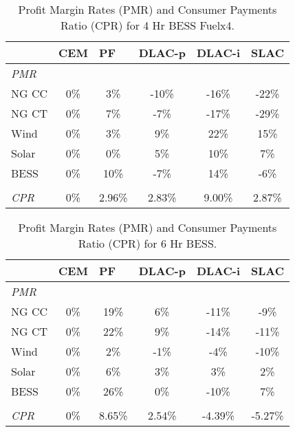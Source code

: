 \documentclass{article}
\begin{document}
\begin{table}[ht]
\centering
\begin{tabular}{lccccc}
\toprule
& \multicolumn{1}{l}{\textbf{CEM}} 
& \multicolumn{1}{l}{\textbf{PF}} 
& \multicolumn{1}{l}{\textbf{DLAC-p}} 
& \multicolumn{1}{l}{\textbf{DLAC-i}} 
& \multicolumn{1}{l}{\textbf{SLAC}} 
 \\ \hline
\midrule
\textit{PMR} & & & & \\
\quad NG CC & 0\% & 3\% & -10\% & -16\% & -22\% \\
\quad NG CT & 0\% & 7\% & -7\% & -17\% & -29\% \\
\quad Wind & 0\% & 3\% & 9\% & 22\% & 15\% \\
\quad Solar & 0\% & 0\% & 5\% & 10\% & 7\% \\
\quad BESS & 0\% & 10\% & -7\% & 14\% & -6\% \\
& & & & \\
\textit{CPR} & 0\% & 2.96\% & 2.83\% & 9.00\% & 2.87\% \\
\bottomrule
\end{tabular}
\caption{Profit Margin Rates (PMR) and Consumer Payments Ratio (CPR) for 4 Hr BESS Fuelx4.}
\label{table:4_Hr_BESS_Fuelx4_pmr}
\end{table}

\begin{table}[ht]
\centering
\begin{tabular}{lccccc}
\toprule
& \multicolumn{1}{l}{\textbf{CEM}} 
& \multicolumn{1}{l}{\textbf{PF}} 
& \multicolumn{1}{l}{\textbf{DLAC-p}} 
& \multicolumn{1}{l}{\textbf{DLAC-i}} 
& \multicolumn{1}{l}{\textbf{SLAC}} 
 \\ \hline
\midrule
\textit{PMR} & & & & \\
\quad NG CC & 0\% & 19\% & 6\% & -11\% & -9\% \\
\quad NG CT & 0\% & 22\% & 9\% & -14\% & -11\% \\
\quad Wind & 0\% & 2\% & -1\% & -4\% & -10\% \\
\quad Solar & 0\% & 6\% & 3\% & 3\% & 2\% \\
\quad BESS & 0\% & 26\% & 0\% & -10\% & 7\% \\
& & & & \\
\textit{CPR} & 0\% & 8.65\% & 2.54\% & -4.39\% & -5.27\% \\
\bottomrule
\end{tabular}
\caption{Profit Margin Rates (PMR) and Consumer Payments Ratio (CPR) for 6 Hr BESS.}
\label{table:6_Hr_BESS_pmr}
\end{table}
\end{document}
